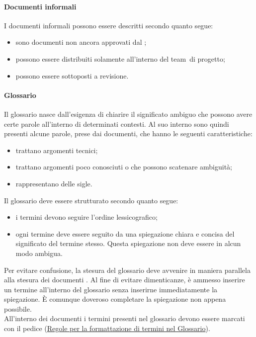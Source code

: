 \documentclass[../NormeProgetto.tex]{subfiles}
\begin{document}
		\paragraph{Documenti informali}
			I documenti informali possono essere descritti secondo quanto segue:
			\begin{itemize}
				\item sono documenti non ancora approvati dal \responsabilediprogetto;
				\item possono essere distribuiti solamente all'interno del team\g\ di progetto;
				\item possono essere sottoposti a revisione.
			\end{itemize}
		
		\paragraph{Glossario} \label{sec:Glossario}
			Il glossario nasce dall'esigenza di chiarire il significato ambiguo che possono avere certe parole all'interno di determinati contesti. Al suo interno sono quindi presenti alcune parole, prese dai documenti, che hanno le seguenti caratteristiche:
			\begin{itemize}
				\item trattano argomenti tecnici;
				\item trattano argomenti poco conosciuti o che possono scatenare ambiguità;
				\item rappresentano delle sigle.
			\end{itemize}
			Il glossario deve essere strutturato secondo quanto segue:
			\begin{itemize}
				\item i termini devono seguire l'ordine lessicografico;
				\item ogni termine deve essere seguito da una spiegazione chiara e concisa del significato del termine stesso. Questa spiegazione non deve essere in alcun modo ambigua.
			\end{itemize}
			Per evitare confusione, la stesura del glossario deve avvenire in maniera parallela alla stesura dei documenti . Al fine di evitare dimenticanze, è ammesso inserire un termine all'interno del glossario senza inserirne immediatamente la spiegazione. È comunque doveroso completare la spiegazione non appena possibile. \\ All'interno dei documenti i termini presenti nel glossario devono essere marcati con il pedice \g (\hyperref[sec:Formattazione termini nel glossario]{Regole per la formattazione di termini nel Glossario}).
		
\end{document}
